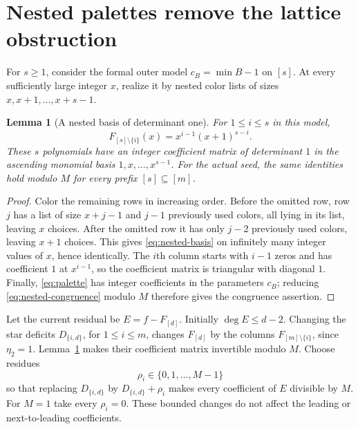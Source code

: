 \documentclass[11pt,a4paper]{article}
\newtheorem{lemma}[theorem]{Lemma}
\theoremstyle{definition}
\begin{document}
\section{Nested palettes remove the lattice obstruction}\label{sec:lattice}

For $s\ge1$, consider the formal outer model $c_B=\min B-1$ on
$[s]$. At every sufficiently large integer $x$, realize it by nested
color lists of sizes $x,x+1,\ldots,x+s-1$.

\begin{lemma}[A nested basis of determinant one]\label{lem:nested}
For $1\le i\le s$ in this model,
\begin{equation}\label{eq:nested-basis}
 F_{[s]\setminus\{i\}}(x)=x^{i-1}(x+1)^{s-i}.
\end{equation}
These $s$ polynomials have an integer coefficient matrix of determinant
$1$ in the ascending monomial basis $1,x,\ldots,x^{s-1}$.
For the actual seed, the same identities hold modulo $M$ for every
prefix $[s]\subseteq[m]$.
\end{lemma}
\begin{proof}
Color the remaining rows in increasing order. Before the omitted row,
row $j$ has a list of size $x+j-1$ and $j-1$ previously used colors,
all lying in its list, leaving $x$ choices. After the omitted row it
has only $j-2$ previously used colors, leaving $x+1$ choices. This gives
\eqref{eq:nested-basis} on infinitely many integer values of $x$, hence
identically. The $i$th column starts with $i-1$ zeros and has coefficient
$1$ at $x^{i-1}$, so the coefficient matrix is triangular with diagonal
$1$. Finally, \eqref{eq:palette} has integer coefficients in the
parameters $c_B$; reducing \eqref{eq:nested-congruence} modulo $M$
therefore gives the congruence assertion.
\end{proof}

Let the current residual be $E=f-F_{[d]}$. Initially $\deg E\le d-2$.
Changing the star deficits $D_{\{i,d\}}$, for $1\le i\le m$, changes
$F_{[d]}$ by the columns $F_{[m]\setminus\{i\}}$, since $\eta_2=1$.
Lemma~\ref{lem:nested} makes their coefficient matrix invertible
modulo $M$. Choose residues
\begin{equation}\label{eq:rho}
 \rho_i\in\{0,1,\ldots,M-1\}
\end{equation}
so that replacing $D_{\{i,d\}}$ by $D_{\{i,d\}}+\rho_i$ makes every
coefficient of $E$ divisible by $M$. For $M=1$ take every $\rho_i=0$.
These bounded changes do not affect the leading or next-to-leading
coefficients.
\end{document}
